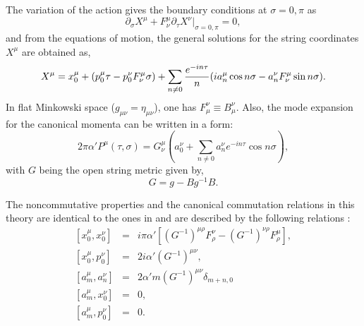\documentclass[a4paper,12pt]{article}
\begin{document}
The variation of the action gives the boundary conditions at $\sigma = 0, 
\pi$ as 
\begin{equation}
\partial_{\sigma} X^{\mu} + F_{\nu}^{\mu} \partial_{\tau} X^{\nu}|_
{\sigma = 0, \pi} = 0,
\label{boundary}
\end{equation}
and from the equations of motion, the general solutions for the string 
coordinates $X^{\mu}$ are obtained as, 
\begin{equation}
X^{\mu} = x_0^{\mu} + (p_0^{\mu} \tau - p_0^{\nu} F_{\nu}^{\mu} \sigma) 
+ \sum_{n\neq 0}{e^{- i n \tau}\over n}
(i a^{\mu}_n \cos n\sigma - a^{\nu}_n F_{\nu}^{\mu} \sin n\sigma).
\label{mode}
\end{equation}
In flat Minkowski space ($g_{\mu \nu} = \eta_{\mu \nu}$), one has 
$F_{\mu}^{\nu} \equiv B_{\mu}^{\nu}$. 
Also, the mode expansion for the canonical momenta 
can be written in a form: 
\begin{equation}
2\pi\alpha' P^{\mu}(\tau, \sigma) = G^{\mu}_{\nu}
(a_0^{\nu} + \sum_{n \neq 0} a_n^{\nu} e^{-i n \tau}
\cos n\sigma ),
\end{equation}
with $G$ being the open string metric given by, 
\begin{equation}
G = g - B g^{-1} B.
\end{equation}

The noncommutative properties and the canonical commutation 
relations in this theory are identical to the ones in 
\cite{chu-ho} and are described by the following relations :
\begin{eqnarray}
\left [x_0^{\mu}, x_0^{\nu} \right ] & = & i \pi \alpha' 
\left [ (G^{-1})^{\mu \rho} F_{\rho}^{\nu} - (G^{-1})^{\nu \rho} 
F_{\rho}^{\mu} \right ], \nonumber \\
\left [ x^{\mu}_0, p^{\nu}_0 \right ] & = & 2 i \alpha' 
(G^{-1})^{\mu\nu}, \nonumber \\
\left [ a^{\mu}_m, a^{\nu}_n \right ] & = & 2 \alpha' m (G^{-1})^{\mu \nu} 
{\delta}_{m + n, 0} \nonumber \\
\left [ a^{\mu}_m, x^{\nu}_0 \right ]  & = & 0, \nonumber \\ 
\left [a^{\mu}_m, p^{\nu}_0 \right ]  & = & 0. 
\label{commute}
\end{eqnarray}
\end{document}
